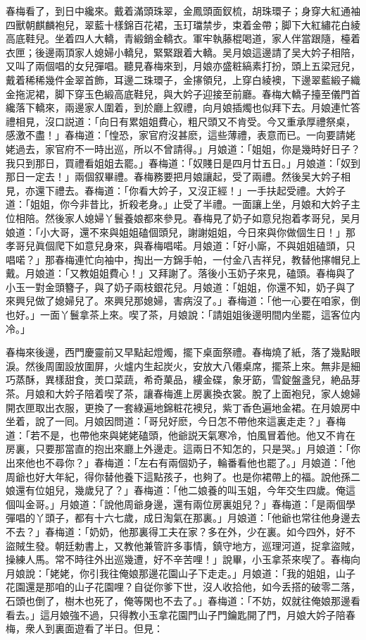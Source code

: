 春梅看了，到日中纔來。戴着滿頭珠翠，金鳳頭面釵梳，胡珠環子；身穿大紅通袖四獸朝麒麟袍兒，翠藍十樣錦百花裙，玉玎璫禁步，束着金帶；脚下大紅繡花白綾高底鞋兒。坐着四人大轎，青緞銷金轎衣。軍牢執藤棍喝道，家人伴當跟隨，檯着衣匣；後邊兩頂家人媳婦小轎兒，緊緊跟着大轎。吴月娘這邊請了吴大妗子相陪，又叫了兩個唱的女兒彈唱。聽見春梅來到，月娘亦盛粧縞素打扮，頭上五梁冠兒，戴着稀稀幾件金翠首飾，耳邊二珠環子，金㩟領兒，上穿白綾襖，下邊翠藍緞子織金拖泥裙，脚下穿玉色緞高底鞋兒，與大妗子迎接至前廳。春梅大轎子擡至儀門首纔落下轎來，兩邊家人圍着，到於廳上叙禮，向月娘插燭也似拜下去。月娘連忙答禮相見，沒口説道：「向日有累姐姐費心，粗尺頭又不肯受。今又重承厚禮祭桌，感激不盡！」春梅道：「惶恐，家官府沒甚麽，這些薄禮，表意而已。一向要請姥姥過去，家官府不一時出巡，所以不曾請得。」月娘道：「姐姐，你是幾時好日子？我只到那日，買禮看姐姐去罷。」春梅道：「奴賤日是四月廿五日。」月娘道：「奴到那日一定去！」兩個叙畢禮。春梅務要把月娘讓起，受了兩禮。然後吴大妗子相見，亦還下禮去。春梅道：「你看大妗子，又沒正經！」一手扶起受禮。大妗子道：「姐姐，你今非昔比，折殺老身。」止受了半禮。一面讓上坐，月娘和大妗子主位相陪。然後家人媳婦丫鬟養娘都來參見。春梅見了奶子如意兒抱着孝哥兒，吴月娘道：「小大哥，還不來與姐姐磕個頭兒，謝謝姐姐，今日來與你做個生日！」那孝哥兒眞個爬下如意兒身來，與春梅唱喏。月娘道：「好小廝，不與姐姐磕頭，只唱喏？」那春梅連忙向袖中，掏出一方錦手帕，一付金八吉祥兒，教替他㩟帽兒上戴。月娘道：「又教姐姐費心！」又拜謝了。落後小玉奶子來見，磕頭。春梅與了小玉一對金頭簪子，與了奶子兩枝銀花兒。月娘道：「姐姐，你還不知，奶子與了來興兒做了媳婦兒了。來興兒那媳婦，害病沒了。」春梅道：「他一心要在咱家，倒也好。」一面丫鬟拿茶上來。喫了茶，月娘說：「請姐姐後邊明間内坐罷，這客位内冷。」

春梅來後邊，西門慶靈前又早點起燈燭，擺下桌面祭禮。春梅燒了紙，落了幾點眼淚。然後周圍設放圍屏，火爐内生起炭火，安放大八僊桌席，擺茶上來。無非是細巧蒸酥，異樣甜食，羙口菜蔬，希奇菓品，縷金碟，象牙筯，雪錠盤盞兒，絶品芽茶。月娘和大妗子陪着喫了茶，讓春梅進上房裏換衣裳。脫了上面袍兒，家人媳婦開衣匣取出衣服，更換了一套綠遍地錦粧花襖兒，紫丁香色遍地金裙。在月娘房中坐着，說了一囘。月娘因問道：「哥兒好麽，今日怎不帶他來這裏走走？」春梅道：「若不是，也帶他來與姥姥磕頭，他爺説天氣寒冷，怕風冒着他。他又不肯在房裏，只要那當直的抱出來廳上外邊走。這兩日不知怎的，只是哭。」月娘道：「你出來他也不尋你？」春梅道：「左右有兩個奶子，輪番看他也罷了。」月娘道：「他周爺也好大年紀，得你替他養下這點孩子，也夠了。也是你裙帶上的福。說他孫二娘還有位姐兒，幾歲兒了？」春梅道：「他二娘養的叫玉姐，今年交生四歲。俺這個叫金哥。」月娘道：「說他周爺身邊，還有兩位房裏姐兒？」春梅道：「是兩個學彈唱的丫頭子，都有十六七歲，成日淘氣在那裏。」月娘道：「他爺也常往他身邊去不去？」春梅道：「奶奶，他那裏得工夫在家？多在外，少在裏。如今四外，好不盜賊生發。朝廷勅書上，又教他兼管許多事情，鎮守地方，巡理河道，捉拿盜賊，操練人馬。常不時往外出巡幾遭，好不辛苦哩！」說畢，小玉拿茶來喫了。春梅向月娘說：「姥姥，你引我往俺娘那邊花園山子下走走。」月娘道：「我的姐姐，山子花園還是那咱的山子花園哩？自従你爹下世，沒人收拾他，如今丢搭的破零二落，石頭也倒了，樹木也死了，俺等閑也不去了。」春梅道：「不妨，奴就往俺娘那邊看看去。」這月娘強不過，只得教小玉拿花園門山子門鑰匙開了門，月娘大妗子陪春梅，衆人到裏面遊看了半日。但見：

